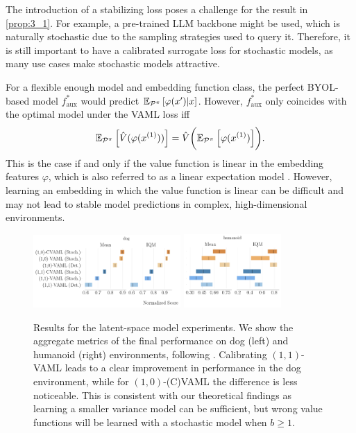 %
The introduction of a stabilizing loss poses a challenge for the result in \autoref{prop:3_1}.
For example, a pre-trained LLM backbone might be used, which is naturally stochastic due to the sampling strategies used to query it.
Therefore, it is still important to have a calibrated surrogate loss for stochastic models, as many use cases make stochastic models attractive.

For a flexible enough model and embedding function class, the perfect BYOL-based model $f^*_\mathrm{aux}$ would predict $\mathbb{E}_{\mathcal{P}^\pi}\left[  \varphi(x')| x \right]$.
However, $f^*_\mathrm{aux}$ only coincides with the optimal model under the VAML loss iff
\begin{align}
    \mathbb{E}_{\mathcal{P}^\pi}\left[  \hat{V}(\varphi(x^{(1)})) \right] = \hat{V}\biggl(\mathbb{E}_{\mathcal{P}^\pi}\left[  \varphi(x^{(1)}) \right]\biggr).
\end{align}
This is the case if and only if the value function is linear in the embedding features $\varphi$, which is also referred to as a linear expectation model \cite{wan2019planning}.
However,  learning an embedding in which the value function is linear can be difficult and may not lead to stable model predictions in complex, high-dimensional environments.

\begin{figure}[t]
\centering
   \includegraphics[width=0.5\textwidth]{figures/lambda/plts/agg_dog.pdf} 
   \includegraphics[width=0.33\textwidth]{figures/lambda/plts/agg_hum.pdf} 
   \caption{Results for the latent-space model experiments. We show the aggregate metrics of the final performance on dog (left) and humanoid (right) environments, following \cite{agarwal2021deep}. Calibrating $(1,1)$-VAML leads to a clear improvement in performance in the dog environment, while for $(1,0)$-(C)VAML the difference is less noticeable. This is consistent with our theoretical findings as learning a smaller variance model can be sufficient, but wrong value functions will be learned with a stochastic model when $b\geq1$.}
   \label{fig:agg_results}
\end{figure}

